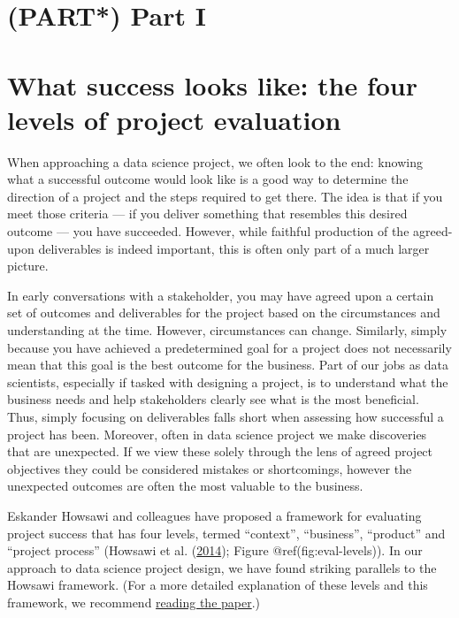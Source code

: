 \documentclass[
]{book}
\begin{document}
\hypertarget{part-part-i}{%
\chapter*{(PART*) Part I}\label{part-part-i}}

\hypertarget{levels}{%
\chapter{What success looks like: the four levels of project
evaluation}\label{levels}}

When approaching a data science project, we often look to the end:
knowing what a successful outcome would look like is a good way to
determine the direction of a project and the steps required to get
there. The idea is that if you meet those criteria --- if you deliver
something that resembles this desired outcome --- you have succeeded.
However, while faithful production of the agreed-upon deliverables is
indeed important, this is often only part of a much larger picture.

In early conversations with a stakeholder, you may have agreed upon a
certain set of outcomes and deliverables for the project based on the
circumstances and understanding at the time. However, circumstances can
change. Similarly, simply because you have achieved a predetermined goal
for a project does not necessarily mean that this goal is the best
outcome for the business. Part of our jobs as data scientists,
especially if tasked with designing a project, is to understand what the
business needs and help stakeholders clearly see what is the most
beneficial. Thus, simply focusing on deliverables falls short when
assessing how successful a project has been. Moreover, often in data
science project we make discoveries that are unexpected. If we view
these solely through the lens of agreed project objectives they could be
considered mistakes or shortcomings, however the unexpected outcomes are
often the most valuable to the business.

Eskander Howsawi and colleagues have proposed a framework for evaluating
project success that has four levels, termed ``context'', ``business'',
``product'' and ``project process'' (Howsawi et al.
(\protect\hyperlink{ref-Howsawi}{2014}); Figure @ref(fig:eval-levels)).
In our approach to data science project design, we have found striking
parallels to the Howsawi framework. (For a more detailed explanation of
these levels and this framework, we recommend
\href{https://doi.org/10.5130/.v1i0.3865}{reading the paper}.)
\end{document}
